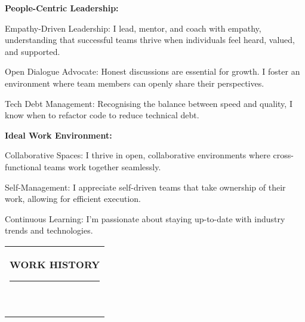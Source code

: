 \documentclass[11pt,A4]{article}
\newcommand{\mpwidth}{\linewidth-\fboxsep-\fboxsep}
\newcommand{\cvlist}[1] {
    \begin{itemize}[itemsep=3pt,topsep=10pt]{#1}\end{itemize}
}
\newcommand{\cvtext}[1] {
    \begin{tabular*}{1\mpwidth}{p{0.98\mpwidth}}
        \parbox{1\mpwidth}{#1}
    \end{tabular*}
}
\newcommand{\cvsection}[1] {
    \vspace{14pt}
    \cvtext{
        \textbf{\LARGE{\textcolor{darkcol}{\uppercase{#1}}}}\\[-4pt]
        \textcolor{maincol}{ \rule{0.1\textwidth}{2pt} } \\
    }
}
\begin{document}
\begin{paracol}{2}
\begin{rightcolumn}
{            \textbf{People-Centric Leadership:}
            \cvlist{
                \item Empathy-Driven Leadership: I lead, mentor, and coach with empathy, understanding that successful teams thrive when individuals feel heard, valued, and supported.
                \item Open Dialogue Advocate: Honest discussions are essential for growth. I foster an environment where team members can openly share their perspectives.
                \item Tech Debt Management: Recognising the balance between speed and quality, I know when to refactor code to reduce technical debt.
            }

            \textbf{Ideal Work Environment:}
            \cvlist{
                \item Collaborative Spaces: I thrive in open, collaborative environments where cross-functional teams work together seamlessly.
                \item Self-Management: I appreciate self-driven teams that take ownership of their work, allowing for efficient execution.
                \item Continuous Learning: I’m passionate about staying up-to-date with industry trends and technologies.
            }
            }

            \vfill\null
            \cvsection{WORK HISTORY}


\end{rightcolumn}
\end{paracol}
\end{document}

